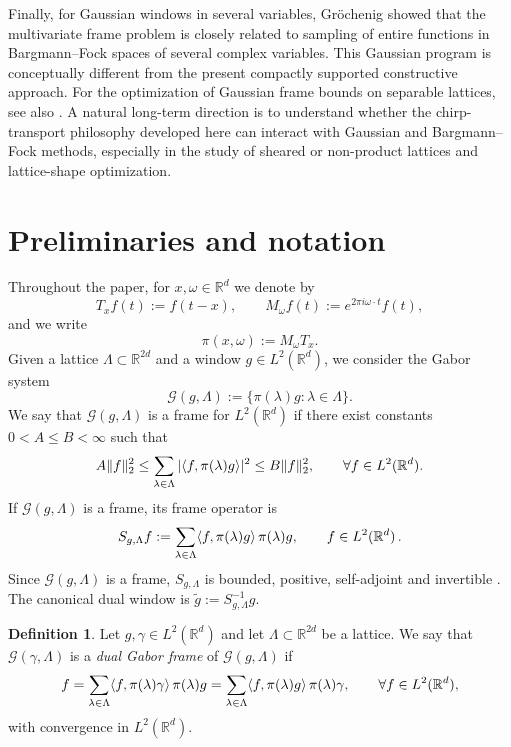 \documentclass[final,1p,times,authoryear]{elsarticle}
\theoremstyle{definition}
\newtheorem{definition}[theorem]{Definition}
\newcommand{\R}{\mathbb{R}}
\newcommand{\1}{\mathbf{1}}
\DeclarePairedDelimiter{\inner}{\langle}{\rangle}
\begin{document}
Finally, for Gaussian windows in several variables, Gröchenig \citep{Gro11} showed that the multivariate frame
problem is closely related to sampling of entire functions in Bargmann--Fock spaces of several complex variables.
This Gaussian program is conceptually different from the present compactly supported constructive approach.
For the optimization of Gaussian frame bounds on separable lattices, see also \citep{FS17}. A natural long-term
direction is to understand whether the chirp-transport philosophy developed here can interact with Gaussian
and Bargmann--Fock methods, {especially in the study of sheared or non-product lattices and lattice-shape optimization.}

\section{Preliminaries and notation}

Throughout the paper, for $x,\omega \in \R^d$ we denote by
$$
T_x f(t):=f(t-x),
\qquad
M_\omega f(t):=e^{2\pi i \omega\cdot t}f(t),
$$
and we write
$$
\pi(x,\omega):=M_\omega T_x.
$$
Given a lattice $\Lambda\subset \R^{2d}$ and a window $g\in L^2(\R^d)$, we consider the Gabor system
$$
\mathcal G(g,\Lambda):=\{\pi(\lambda)g:\lambda\in\Lambda\}.
$$
We say that $\mathcal G(g,\Lambda)$ is a frame for $L^2(\R^d)$ if there exist constants
$0<A\leq B<\infty$ such that
$$
A\|f\|_2^2
\leq
\sum_{\lambda\in\Lambda} |\inner{f,\pi(\lambda)g}|^2
\leq
B\|f\|_2^2,
\qquad \forall f\in L^2(\R^d).
$$
If $\mathcal G(g,\Lambda)$ is a frame, its frame operator is
$$
S_{g,\Lambda}f
:=
\sum_{\lambda\in\Lambda}\inner{f,\pi(\lambda)g}\,\pi(\lambda)g,
\qquad f\in L^2(\R^d)\, .
$$
Since $\mathcal{G}(g, \Lambda)$ is a frame, $S_{g, \Lambda}$ is bounded, positive, self-adjoint and invertible \citep{Christensen2016}. The canonical dual window is $\tilde{g}:=S_{g, \Lambda}^{-1} g$.


\begin{definition}
Let $g,\gamma\in L^2(\R^d)$ and let $\Lambda\subset \R^{2d}$ be a lattice.
We say that $\mathcal G(\gamma,\Lambda)$ is a \emph{dual Gabor frame} of
$\mathcal G(g,\Lambda)$ if
$$
f
=
\sum_{\lambda\in\Lambda}\inner{f,\pi(\lambda)\gamma}\,\pi(\lambda)g
=
\sum_{\lambda\in\Lambda}\inner{f,\pi(\lambda)g}\,\pi(\lambda)\gamma,
\qquad \forall f\in L^2(\R^d),
$$
with convergence in $L^2(\R^d)$.
\end{definition}
\end{document}
